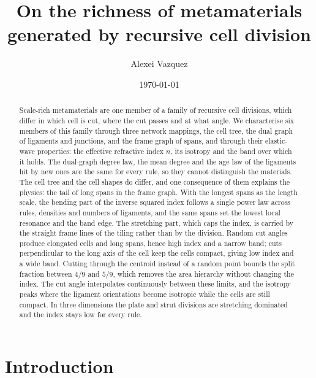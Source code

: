 \documentclass[aps,pre,twocolumn,superscriptaddress,amsmath,amssymb,floatfix]{revtex4-2}
\begin{document}
\title{On the richness of metamaterials generated by recursive cell division}

\author{Alexei Vazquez}

\date{\today}

\begin{abstract}
Scale-rich metamaterials are one member of a family of recursive cell divisions, which
differ in which cell is cut, where the cut passes and at what angle. We characterise six
members of this family through three network mappings, the cell tree, the dual graph of
ligaments and junctions, and the frame graph of spans, and through their elastic-wave
properties: the effective refractive index $n$, its isotropy and the band over which it
holds. The dual-graph degree law, the mean degree and the age law of the ligaments hit by
new ones are the same for every rule, so they cannot distinguish the materials. The cell
tree and the cell shapes do differ, and one consequence of them explains the physics: the
tail of long spans in the frame graph. With the longest spans as the length scale, the
bending part of the inverse squared index follows a single power law across rules,
densities and numbers of ligaments, and the same spans set the lowest local resonance and
the band edge. The stretching part, which caps the index, is carried by the straight frame
lines of the tiling rather than by the division. Random cut angles produce elongated cells and long spans, hence high index and
a narrow band; cuts perpendicular to the long axis of the cell keep the cells compact,
giving low index and a wide band. Cutting through the centroid instead of a random point
bounds the split fraction between $4/9$ and $5/9$, which removes the area hierarchy without
changing the index. The cut angle interpolates continuously between these limits, and the
isotropy peaks where the ligament orientations become isotropic while the cells are still
compact. In three dimensions the plate and strut divisions are stretching dominated and the
index stays low for every rule.
\end{abstract}

\maketitle

\section{Introduction}
\end{document}
